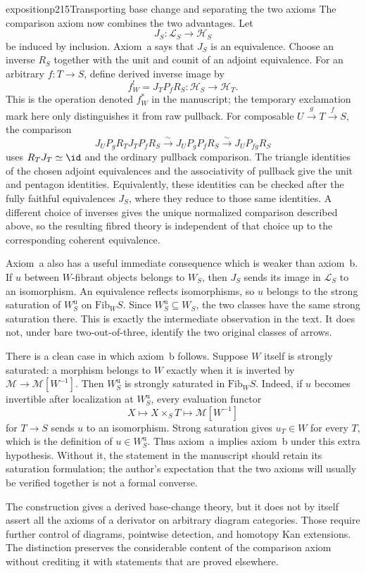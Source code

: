 \begin{dcomment}{exposition}{p215}{Transporting base change and separating the two axioms}
The comparison axiom now combines the two advantages. Let
\[
 J_S:\mathcal L_S\longrightarrow\mathcal H_S
\]
be induced by inclusion. Axiom~a says that $J_S$ is an equivalence. Choose an inverse $R_S$ together with the unit and counit of an adjoint equivalence. For an arbitrary $f:T\to S$, define derived inverse image by
\[
 f^!_W=J_TP_fR_S:\mathcal H_S\longrightarrow\mathcal H_T.
\]
This is the operation denoted $f^*_W$ in the manuscript; the temporary exclamation mark here only distinguishes it from raw pullback. For composable $U\xrightarrow{g}T\xrightarrow{f}S$, the comparison
\[
 J_UP_gR_TJ_TP_fR_S\xrightarrow{\sim}
 J_UP_gP_fR_S\xrightarrow{\sim}J_UP_{fg}R_S
\]
uses $R_TJ_T\simeq\id$ and the ordinary pullback comparison. The triangle identities of the chosen adjoint equivalences and the associativity of pullback give the unit and pentagon identities. Equivalently, these identities can be checked after the fully faithful equivalences $J_S$, where they reduce to those same identities. A different choice of inverses gives the unique normalized comparison described above, so the resulting fibred theory is independent of that choice up to the corresponding coherent equivalence.

Axiom~a also has a useful immediate consequence which is weaker than axiom~b. If $u$ between $W$-fibrant objects belongs to $W_S$, then $J_S$ sends its image in $\mathcal L_S$ to an isomorphism. An equivalence reflects isomorphisms, so $u$ belongs to the strong saturation of $W_S^{\mathrm u}$ on $\mathrm{Fib}_W S$. Since $W_S^{\mathrm u}\subseteq W_S$, the two classes have the same strong saturation there. This is exactly the intermediate observation in the text. It does not, under bare two-out-of-three, identify the two original classes of arrows.

There is a clean case in which axiom~b follows. Suppose $W$ itself is strongly saturated: a morphism belongs to $W$ exactly when it is inverted by $\mathcal M\to\mathcal M[W^{-1}]$. Then $W_S^{\mathrm u}$ is strongly saturated in $\mathrm{Fib}_W S$. Indeed, if $u$ becomes invertible after localization at $W_S^{\mathrm u}$, every evaluation functor
\[
 X\longmapsto X\times_ST\longmapsto
 \mathcal M[W^{-1}]
\]
for $T\to S$ sends $u$ to an isomorphism. Strong saturation gives $u_T\in W$ for every $T$, which is the definition of $u\in W_S^{\mathrm u}$. Thus axiom~a implies axiom~b under this extra hypothesis. Without it, the statement in the manuscript should retain its saturation formulation; the author's expectation that the two axioms will usually be verified together is not a formal converse.

The construction gives a derived base-change theory, but it does not by itself assert all the axioms of a derivator on arbitrary diagram categories. Those require further control of diagrams, pointwise detection, and homotopy Kan extensions. The distinction preserves the considerable content of the comparison axiom without crediting it with statements that are proved elsewhere.
\end{dcomment}

